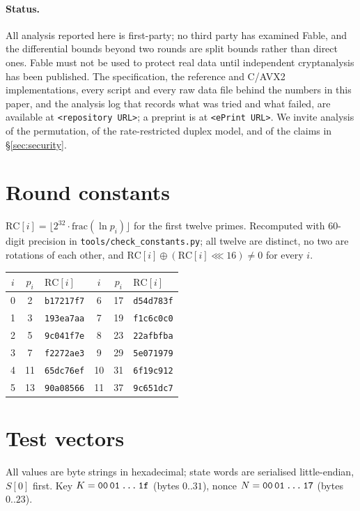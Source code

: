 \documentclass{iacrtrans}
\newcommand{\Fable}{\textsf{Fable}\xspace}
\newcommand{\rotl}{\lll}
\newcommand{\RepoURL}{\texttt{<repository URL>}}
\newcommand{\EprintURL}{\texttt{<ePrint URL>}}
\newcommand{\RepoURL}{\url{https://github.com/cux-rn/fable}}
\newcommand{\EprintURL}{\texttt{<ePrint number pending>}}
\begin{document}
\paragraph{Status.} All analysis reported here is first-party; no third party has examined \Fable, and the differential bounds beyond two rounds are split bounds rather than direct ones. \Fable must not be used to protect real data until independent cryptanalysis has been published. The specification, the reference and C/AVX2 implementations, every script and every raw data file behind the numbers in this paper, and the analysis log that records what was tried and what failed, are available at \RepoURL; a preprint is at \EprintURL. We invite analysis of the permutation, of the rate-restricted duplex model, and of the claims in \S\ref{sec:security}.




\appendix
\section{Round constants}
\label{app:rc}
$\mathrm{RC}[i] = \lfloor 2^{32} \cdot \mathrm{frac}(\ln p_i) \rfloor$ for the first twelve primes. Recomputed with 60-digit precision in \texttt{tools/check\_constants.py}; all twelve are distinct, no two are rotations of each other, and $\mathrm{RC}[i] \oplus (\mathrm{RC}[i] \rotl 16) \neq 0$ for every $i$.

\begin{center}
\begin{tabular}{ccl@{\qquad}ccl}
\toprule
$i$ & $p_i$ & $\mathrm{RC}[i]$ & $i$ & $p_i$ & $\mathrm{RC}[i]$\\
\midrule
0 & 2 & \texttt{b17217f7} & 6 & 17 & \texttt{d54d783f}\\
1 & 3 & \texttt{193ea7aa} & 7 & 19 & \texttt{f1c6c0c0}\\
2 & 5 & \texttt{9c041f7e} & 8 & 23 & \texttt{22afbfba}\\
3 & 7 & \texttt{f2272ae3} & 9 & 29 & \texttt{5e071979}\\
4 & 11 & \texttt{65dc76ef} & 10 & 31 & \texttt{6f19c912}\\
5 & 13 & \texttt{90a08566} & 11 & 37 & \texttt{9c651dc7}\\
\bottomrule
\end{tabular}
\end{center}

\section{Test vectors}
\label{app:vectors}
All values are byte strings in hexadecimal; state words are serialised little-endian, $S[0]$ first. Key $K = \texttt{00\,01\,\ldots\,1f}$ (bytes $0..31$), nonce $N = \texttt{00\,01\,\ldots\,17}$ (bytes $0..23$).
\end{document}
